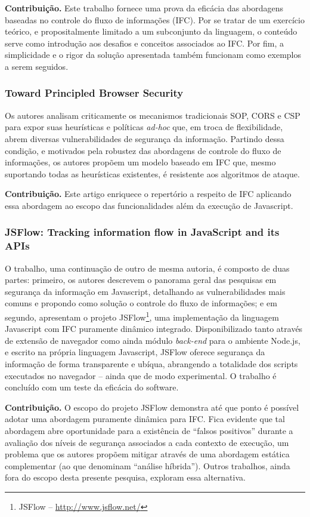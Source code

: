 \textbf{Contribuição.} Este trabalho fornece uma prova da eficácia das abordagens baseadas no controle do fluxo de informações (IFC). Por se tratar de um exercício teórico, e propositalmente limitado a um subconjunto da linguagem, o conteúdo serve como introdução aos desafios e conceitos associados ao IFC. Por fim, a simplicidade e o rigor da solução apresentada também funcionam como exemplos a serem seguidos.


\subsubsection{Toward Principled Browser Security \cite{Yang2013}}
Os autores analisam criticamente os mecanismos tradicionais SOP, CORS e CSP para expor suas heurísticas e políticas \textit{ad-hoc} que, em troca de flexibilidade, abrem diversas vulnerabilidades de segurança da informação. Partindo dessa condição, e motivados pela robustez das abordagens de controle do fluxo de informações, os autores propõem um modelo baseado em IFC que, mesmo suportando todas as heurísticas existentes, é resistente aos algoritmos de ataque.

\textbf{Contribuição.} Este artigo enriquece o repertório a respeito de IFC aplicando essa abordagem ao escopo das funcionalidades além da execução de Javascript.


\subsubsection{JSFlow: Tracking information flow in JavaScript and its APIs \cite{Hedin2014}}
O trabalho, uma continuação de outro de mesma autoria\cite{Hedin2012}, é composto de duas partes: primeiro, os autores descrevem o panorama geral das pesquisas em segurança da informação em Javascript, detalhando as vulnerabilidades mais comuns e propondo como solução o controle do fluxo de informações; e em segundo, apresentam o projeto JSFlow\footnote{JSFlow -- \url{http://www.jsflow.net/}}, uma implementação da linguagem Javascript com IFC puramente dinâmico integrado. Disponibilizado tanto através de extensão de navegador como ainda módulo \textit{back-end} para o ambiente Node.js, e escrito na própria linguagem Javascript, JSFlow oferece segurança da informação de forma transparente e ubíqua, abrangendo a totalidade dos scripts executados no navegador -- ainda que de modo experimental. O trabalho é concluído com um teste da eficácia do software.

\textbf{Contribuição.} O escopo do projeto JSFlow demonstra até que ponto é possível adotar uma abordagem puramente dinâmica para IFC. Fica evidente que tal abordagem abre oportunidade para a existência de ``falsos positivos'' durante a avaliação dos níveis de segurança associados a cada contexto de execução, um problema que os autores propõem mitigar através de uma abordagem estática complementar (ao que denominam ``análise híbrida''). Outros trabalhos, ainda fora do escopo desta presente pesquisa, exploram essa alternativa.


